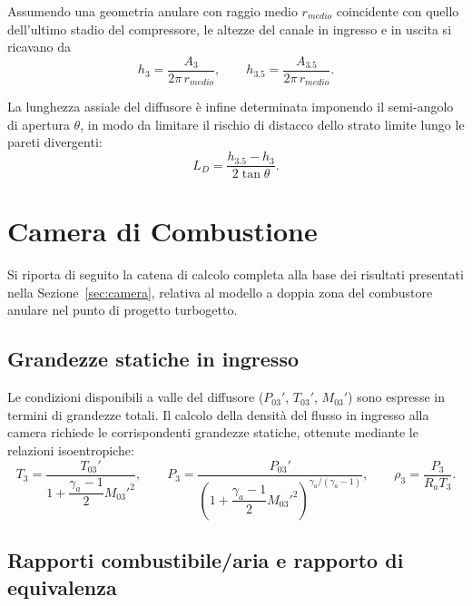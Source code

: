 Assumendo una geometria anulare con raggio medio $r_{medio}$ coincidente con quello dell'ultimo stadio del compressore, le altezze del canale in ingresso e in uscita si ricavano da
\begin{equation*}
    h_3 = \frac{A_3}{2\pi\,r_{medio}}, \qquad h_{3.5} = \frac{A_{3.5}}{2\pi\,r_{medio}}.
\end{equation*}

La lunghezza assiale del diffusore è infine determinata imponendo il semi-angolo di apertura $\theta$, in modo da limitare il rischio di distacco dello strato limite lungo le pareti divergenti:
\begin{equation*}
    L_D = \frac{h_{3.5}-h_3}{2\tan\theta}.
\end{equation*}

\section{Camera di Combustione}
\label{app:camera_combustione}


Si riporta di seguito la catena di calcolo completa alla base dei risultati presentati nella Sezione~\ref{sec:camera}, relativa al modello a doppia zona del combustore anulare nel punto di progetto turbogetto.

\subsection{Grandezze statiche in ingresso}

Le condizioni disponibili a valle del diffusore ($P_{03}'$, $T_{03}'$, $M_{03}'$) sono espresse in termini di grandezze totali. Il calcolo della densità del flusso in ingresso alla camera richiede le corrispondenti grandezze statiche, ottenute mediante le relazioni isoentropiche:
\begin{equation*}
    T_3 = \frac{T_{03}'}{1 + \dfrac{\gamma_a - 1}{2} M_{03}'^2}, \qquad
    P_3 = \frac{P_{03}'}{\left(1 + \dfrac{\gamma_a - 1}{2} M_{03}'^2\right)^{\gamma_a/(\gamma_a - 1)}}, \qquad
    \rho_3 = \frac{P_3}{R_a T_3}.
\end{equation*}

\subsection{Rapporti combustibile/aria e rapporto di equivalenza}

